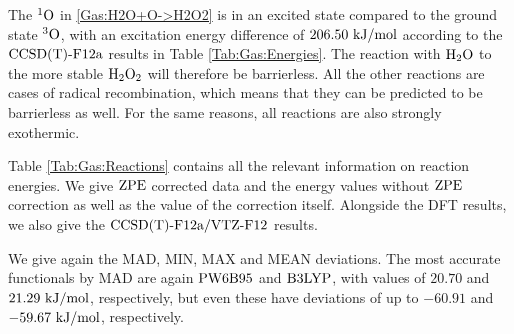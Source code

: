 The ${^1\text{O}}$ in \eqref{Gas:H2O+O->H2O2} is in an excited state
compared to the ground state ${^3\text{O}}$, with an excitation energy difference
of $206.50~\text {kJ/mol}$ according to the $\text{CCSD(T)-F12a}$ results in Table
\ref{Tab:Gas:Energies}. The reaction with $\text H _2 \text O$ to the more stable
$\text H _2 \text O_2$ will therefore be barrierless. All the other reactions are cases of
radical recombination, which means that they can be predicted to be barrierless
as well. For the same reasons, all reactions are also strongly exothermic.

Table \ref{Tab:Gas:Reactions} contains all the relevant information on
reaction energies. We give $\text{ZPE}$ corrected data and the energy
values without $\text{ZPE}$ correction as well as the value of the correction
itself. Alongside the DFT results, we also give the $\text{CCSD(T)-F12a}/\text{VTZ-F}12$ results.

We give again the MAD, MIN, MAX and MEAN deviations.
The most accurate functionals by MAD are again $\text{PW6B95}$
and $\text{B3LYP}$, with values of $20.70$ and $21.29~\text {kJ/mol}$, respectively,
but even these have deviations of up to $-60.91$ and $-59.67~\text {kJ/mol}$,
respectively.

